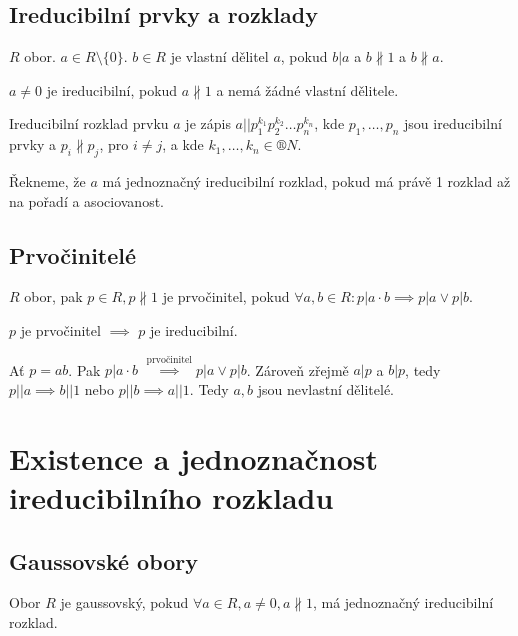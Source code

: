 \documentclass[12pt]{article}                   %
\begin{document}
    \subsection{Ireducibilní prvky a rozklady}
        \begin{definice}
            $R$ obor. $a \in R \setminus \{0\}$. $b \in R$ je vlastní dělitel $a$, pokud $b|a$ a $b \nparallel 1$ a $b \nparallel a$.

            $a≠0$ je ireducibilní, pokud $a \nparallel 1$ a nemá žádné vlastní dělitele.
        \end{definice}

        \begin{definice}
            Ireducibilní rozklad prvku $a$ je zápis $a || p_1^{k_1}p_2^{k_2}…p_n^{k_n}$, kde $p_1, …, p_n$ jsou ireducibilní prvky a $p_i \nparallel p_j$, pro $i≠j$, a kde $k_1, …, k_n \in ®N$.

            Řekneme, že $a$ má jednoznačný ireducibilní rozklad, pokud má právě 1 rozklad až na pořadí a asociovanost.
        \end{definice}

    \subsection{Prvočinitelé}
        \begin{definice}[Prvočinitel]
            $R$ obor, pak $p \in R, p \nparallel 1$ je prvočinitel, pokud $\forall a, b \in R: p|a·b \implies p|a \lor p|b$.
        \end{definice}

        \begin{pozorovani}
            $p$ je prvočinitel $\implies$ $p$ je ireducibilní.

            \begin{dukazin}
                Ať $p = ab$. Pak $p|a·b$ $\overset{\text{prvočinitel}}{\implies} p|a \lor p|b$. Zároveň zřejmě $a|p$ a $b|p$, tedy $p||a \implies b||1$ nebo $p||b \implies a||1$. Tedy $a, b$ jsou nevlastní dělitelé.
            \end{dukazin}
        \end{pozorovani}

\section{Existence a jednoznačnost ireducibilního rozkladu}
    \subsection{Gaussovské obory}
        \begin{definice}
            Obor $R$ je gaussovský, pokud $\forall a \in R, a≠0, a \nparallel 1$, má jednoznačný ireducibilní rozklad.
        \end{definice}
\end{document}
